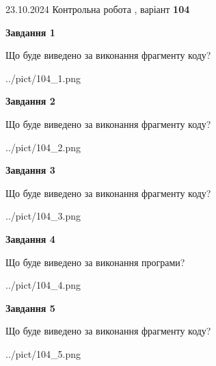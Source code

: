 \documentclass[12pt, ukrainian]{article}
\begin{document}
{\Large{23.10.2024 Контрольна робота , варіант  \No \textbf { 104 }\par}}
{
\begin {large}
{\begin {center}\textbf{Завдання 1}\end {center}}

Що буде виведено за виконання фрагменту коду?\par
\begin{center}
	{../pict/104_1.png}
\end{center}
\newpage

{\begin {center}\textbf{Завдання 2}\end {center}}

Що буде виведено за виконання фрагменту коду?\par
\begin{center}
	{../pict/104_2.png}
\end{center}
\newpage

{\begin {center}\textbf{Завдання 3}\end {center}}

Що буде виведено за виконання фрагменту коду?\par
\begin{center}
	{../pict/104_3.png}
\end{center}
\newpage

{\begin {center}\textbf{Завдання 4}\end {center}}

Що буде виведено за виконання програми?\par
\begin{center}
	{../pict/104_4.png}
\end{center}
\newpage

{\begin {center}\textbf{Завдання 5}\end {center}}

Що буде виведено за виконання фрагменту коду?\par
\begin{center}
	{../pict/104_5.png}
\end{center}
\newpage


\end{large}}
\end{document}
